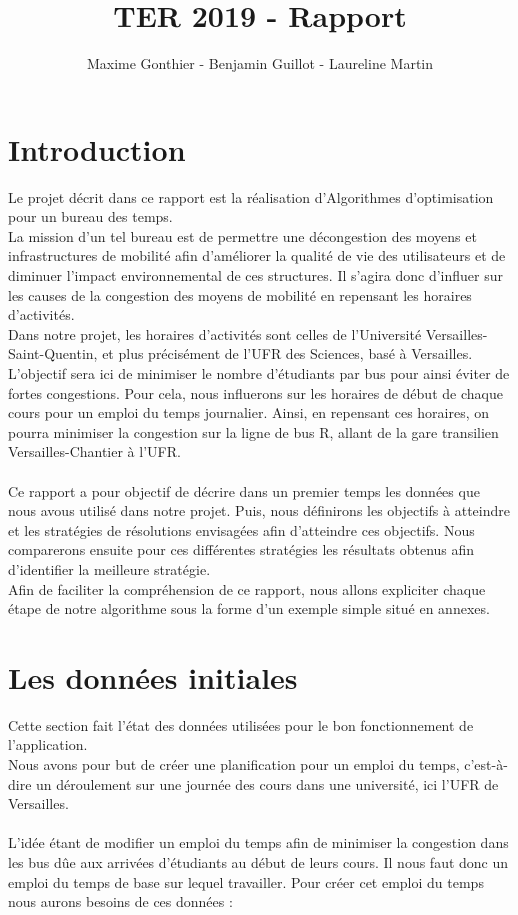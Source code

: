 \documentclass[a4paper,11pt]{article}
\title{TER 2019 - Rapport}
\author{Maxime Gonthier - Benjamin Guillot - Laureline Martin}
\begin{document}
\clearpage
\maketitle

\newpage
\tableofcontents

\newpage
\section{Introduction}
	Le projet décrit dans ce rapport est la réalisation d'Algorithmes d'optimisation pour un bureau des temps.\\
	La mission d'un tel bureau est de permettre une décongestion des moyens et infrastructures de mobilité afin d'améliorer la qualité de vie des utilisateurs et de diminuer l'impact environnemental de ces structures. Il s'agira donc d'influer sur les causes de la congestion des moyens de mobilité en repensant les horaires d'activités.\\
	Dans notre projet, les horaires d'activités sont celles de l'Université Versailles-Saint-Quentin, et plus précisément de l'UFR des Sciences, basé à Versailles. L'objectif sera ici de minimiser le nombre d'étudiants par bus pour ainsi éviter de fortes congestions. Pour cela, nous influerons sur les horaires de début de chaque cours pour un emploi du temps journalier. Ainsi, en repensant ces horaires, on pourra minimiser la congestion sur la ligne de bus R, allant de la gare transilien Versailles-Chantier à l'UFR.\\
	\\
	Ce rapport a pour objectif de décrire dans un premier temps les données que nous avous utilisé dans notre projet. Puis, nous définirons les objectifs à atteindre et les stratégies de résolutions envisagées afin d'atteindre ces objectifs. Nous comparerons ensuite pour ces différentes stratégies les résultats obtenus afin d'identifier la meilleure stratégie.\\
	Afin de faciliter la compréhension de ce rapport, nous allons expliciter chaque étape de notre algorithme sous la forme d'un exemple simple situé en annexes.
	
\section{Les données initiales}
	Cette section fait l'état des données utilisées pour le bon fonctionnement de l'application.\\
	Nous avons pour but de créer une planification pour un emploi du temps, c'est-à-dire un déroulement sur une journée des cours dans une université, ici l'UFR de Versailles.\\
	\\
	L'idée étant de modifier un emploi du temps afin de minimiser la congestion dans les bus dûe aux arrivées d'étudiants au début de leurs cours. Il nous faut donc un emploi du temps de base sur lequel travailler. Pour créer cet emploi du temps nous aurons besoins de ces données : \\
\end{document}
